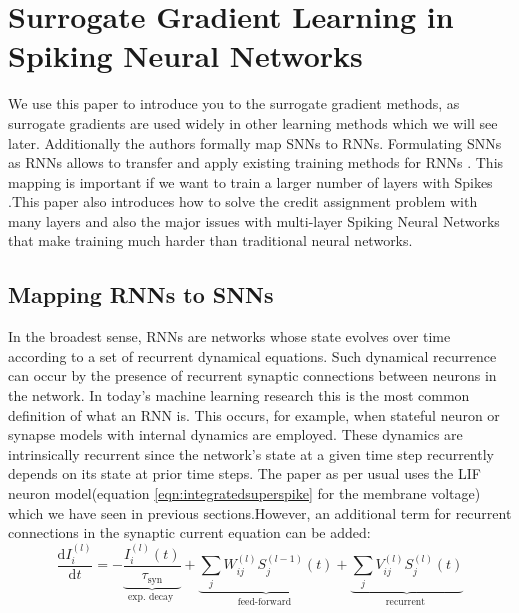 \documentclass[12pt]{report}
\begin{document}
\section{Surrogate Gradient Learning in Spiking Neural Networks}
We use this paper to introduce you to the surrogate gradient methods, as surrogate gradients are used widely in other learning methods which we will see later. Additionally the authors formally map SNNs to RNNs. Formulating SNNs as RNNs allows to transfer and apply existing training methods for RNNs \cite{neft2019}. This mapping is important if we want to train a larger number of layers with Spikes .This paper also introduces how to solve the credit assignment problem with many layers and also the major issues with multi-layer Spiking Neural Networks that make training much harder than traditional neural networks.
\subsection{Mapping RNNs to SNNs}
In the broadest sense, RNNs are networks whose state evolves over time according to a set of recurrent dynamical equations. Such dynamical recurrence can occur by the presence of recurrent synaptic connections between neurons in the network. In today's machine learning research this is the most common definition of what an RNN is. This occurs, for example, when stateful neuron or synapse models with internal dynamics are employed. These dynamics are intrinsically recurrent since the network's state at a given time step recurrently depends on its state at prior time steps. The paper as per usual uses the LIF neuron model(equation \ref{eqn:integratedsuperspike} for the membrane voltage) which we have seen in previous sections.However, an additional term for recurrent connections in the synaptic current equation can be added:
\begin{equation}
\label{eqn:surrogate_current_dynamics}
\frac{\mathrm{d} I_{i}^{(l)}}{\mathrm{d} t}=-\underbrace{\frac{I_{i}^{(l)}(t)}{\tau_{\mathrm{syn}}}}_{\text {exp. decay }}+\underbrace{\sum_{j} W_{i j}^{(l)} S_{j}^{(l-1)}(t)}_{\text {feed-forward }}+\underbrace{\sum_{j} V_{i j}^{(l)} S_{j}^{(l)}(t)}_{\text {recurrent }}
\end{equation}
\end{document}

